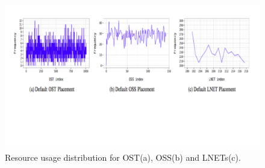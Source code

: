 \begin{figure}[tbh]
  \centering
  \includegraphics[width=\columnwidth]{graphics/infrastructure.pdf}\vspace{-1.2in}
  \caption{Resource usage distribution for OST(a), OSS(b) and LNETs(c). }
\end{figure}

